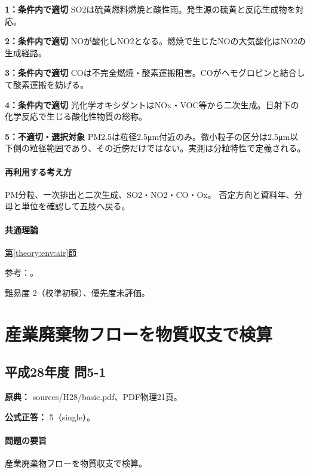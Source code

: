 \noindent\textbf{1：条件内で適切} SO2は硫黄燃料燃焼と酸性雨。発生源の硫黄と反応生成物を対応。\par

\noindent\textbf{2：条件内で適切} NOが酸化しNO2となる。燃焼で生じたNOの大気酸化はNO2の生成経路。\par

\noindent\textbf{3：条件内で適切} COは不完全燃焼・酸素運搬阻害。COがヘモグロビンと結合して酸素運搬を妨げる。\par

\noindent\textbf{4：条件内で適切} 光化学オキシダントはNOx・VOC等から二次生成。日射下の化学反応で生じる酸化性物質の総称。\par

\noindent\textbf{5：不適切・選択対象} PM2.5は粒径2.5μm付近のみ。微小粒子の区分は2.5μm以下側の粒径範囲であり、その近傍だけではない。実測は分粒特性で定義される。\par

\paragraph{再利用する考え方} PM分粒、一次排出と二次生成、SO2・NO2・CO・Ox。 否定方向と資料年、分母と単位を確認して五肢へ戻る。

\paragraph{共通理論} \hyperref[theory:env:air]{第\ref*{theory:env:air}節}

\par 参考：\cite{env58_pm25}。

\par 難易度 2（校準初稿）、優先度未評価。

\section{産業廃棄物フローを物質収支で検算}

\subsection{平成28年度 問5-1}
\label{q:h28-reg-basic-5-1}

\noindent\textbf{原典：} sources/H28/basic.pdf、PDF物理21頁。

\textbf{公式正答：} 5（single）。

\paragraph{問題の要旨} 産業廃棄物フローを物質収支で検算。

